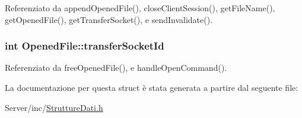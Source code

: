 Referenziato da append\+Opened\+File(), close\+Client\+Session(), get\+File\+Name(), get\+Opened\+File(), get\+Transfer\+Socket(), e send\+Invalidate().

\subsubsection[{\texorpdfstring{transfer\+Socket\+Id}{transferSocketId}}]{\setlength{\rightskip}{0pt plus 5cm}int Opened\+File\+::transfer\+Socket\+Id}\hypertarget{structOpenedFile_a2b10a150aba89a8d193cd251012682a7}{}\label{structOpenedFile_a2b10a150aba89a8d193cd251012682a7}


Referenziato da free\+Opened\+File(), e handle\+Open\+Command().



La documentazione per questa struct è stata generata a partire dal seguente file\+:\begin{DoxyCompactItemize}
\item 
Server/inc/\hyperlink{StruttureDati_8h}{Strutture\+Dati.\+h}\end{DoxyCompactItemize}
